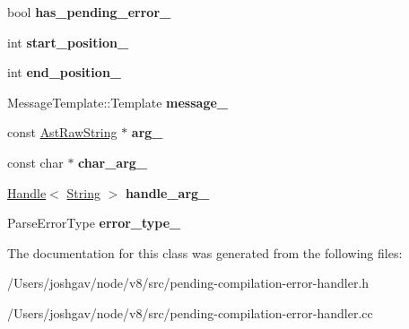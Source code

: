 \begin{DoxyCompactItemize}
\item 
bool {\bfseries has\+\_\+pending\+\_\+error\+\_\+}\hypertarget{classv8_1_1internal_1_1_pending_compilation_error_handler_a0e9f7eb45e5d41dce5ba535710a44b79}{}\label{classv8_1_1internal_1_1_pending_compilation_error_handler_a0e9f7eb45e5d41dce5ba535710a44b79}

\item 
int {\bfseries start\+\_\+position\+\_\+}\hypertarget{classv8_1_1internal_1_1_pending_compilation_error_handler_a04dbb2f4334bc3acb9d0bec29c314f19}{}\label{classv8_1_1internal_1_1_pending_compilation_error_handler_a04dbb2f4334bc3acb9d0bec29c314f19}

\item 
int {\bfseries end\+\_\+position\+\_\+}\hypertarget{classv8_1_1internal_1_1_pending_compilation_error_handler_a8b8da67978ff4b62242ee2c6a51ef41e}{}\label{classv8_1_1internal_1_1_pending_compilation_error_handler_a8b8da67978ff4b62242ee2c6a51ef41e}

\item 
Message\+Template\+::\+Template {\bfseries message\+\_\+}\hypertarget{classv8_1_1internal_1_1_pending_compilation_error_handler_ae34e4dd7c08608c4c57a4884386d8852}{}\label{classv8_1_1internal_1_1_pending_compilation_error_handler_ae34e4dd7c08608c4c57a4884386d8852}

\item 
const \hyperlink{classv8_1_1internal_1_1_ast_raw_string}{Ast\+Raw\+String} $\ast$ {\bfseries arg\+\_\+}\hypertarget{classv8_1_1internal_1_1_pending_compilation_error_handler_a02c3f983e7f21b2e8e6f6402912219bf}{}\label{classv8_1_1internal_1_1_pending_compilation_error_handler_a02c3f983e7f21b2e8e6f6402912219bf}

\item 
const char $\ast$ {\bfseries char\+\_\+arg\+\_\+}\hypertarget{classv8_1_1internal_1_1_pending_compilation_error_handler_a285bdde138de08c1c401e2655de93cbd}{}\label{classv8_1_1internal_1_1_pending_compilation_error_handler_a285bdde138de08c1c401e2655de93cbd}

\item 
\hyperlink{classv8_1_1internal_1_1_handle}{Handle}$<$ \hyperlink{classv8_1_1internal_1_1_string}{String} $>$ {\bfseries handle\+\_\+arg\+\_\+}\hypertarget{classv8_1_1internal_1_1_pending_compilation_error_handler_a13bcac3ff39f8e4a0dee8bffc6c54db8}{}\label{classv8_1_1internal_1_1_pending_compilation_error_handler_a13bcac3ff39f8e4a0dee8bffc6c54db8}

\item 
Parse\+Error\+Type {\bfseries error\+\_\+type\+\_\+}\hypertarget{classv8_1_1internal_1_1_pending_compilation_error_handler_a9c94bf420e70d6bb1d320f74e73522cd}{}\label{classv8_1_1internal_1_1_pending_compilation_error_handler_a9c94bf420e70d6bb1d320f74e73522cd}

\end{DoxyCompactItemize}


The documentation for this class was generated from the following files\+:\begin{DoxyCompactItemize}
\item 
/\+Users/joshgav/node/v8/src/pending-\/compilation-\/error-\/handler.\+h\item 
/\+Users/joshgav/node/v8/src/pending-\/compilation-\/error-\/handler.\+cc\end{DoxyCompactItemize}
